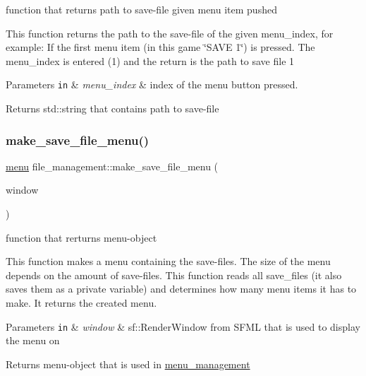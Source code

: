 function that returns path to save-\/file given menu item pushed 

This function returns the path to the save-\/file of the given menu\+\_\+index, for example\+: If the first menu item (in this game \char`\"{}\+S\+A\+V\+E 1\char`\"{}) is pressed. The menu\+\_\+index is entered (1) and the return is the path to save file 1


\begin{DoxyParams}[1]{Parameters}
\mbox{\tt in}  & {\em menu\+\_\+index} & index of the menu button pressed.\\
\hline
\end{DoxyParams}
\begin{DoxyReturn}{Returns}
std\+::string that contains path to save-\/file 
\end{DoxyReturn}
\mbox{\label{classfile__management_a97eda13bca5dbe703663bf81f83a77a0}} 
\subsubsection{\texorpdfstring{make\+\_\+save\+\_\+file\+\_\+menu()}{make\_save\_file\_menu()}}
{\footnotesize\ttfamily \hyperlink{classmenu}{menu} file\+\_\+management\+::make\+\_\+save\+\_\+file\+\_\+menu (\begin{DoxyParamCaption}\item[{sf\+::\+Render\+Window \&}]{window }\end{DoxyParamCaption})}



function that rerturns menu-\/object 

This function makes a menu containing the save-\/files. The size of the menu depends on the amount of save-\/files. This function reads all save\+\_\+files (it also saves them as a private variable) and determines how many menu items it has to make. It returns the created menu.


\begin{DoxyParams}[1]{Parameters}
\mbox{\tt in}  & {\em window} & sf\+::\+Render\+Window from S\+F\+ML that is used to display the menu on\\
\hline
\end{DoxyParams}
\begin{DoxyReturn}{Returns}
menu-\/object that is used in \hyperlink{classmenu__management}{menu\+\_\+management} 
\end{DoxyReturn}
\mbox{\label{classfile__management_a75689c420580c71f0621dfbcc4c2a06f}} 

